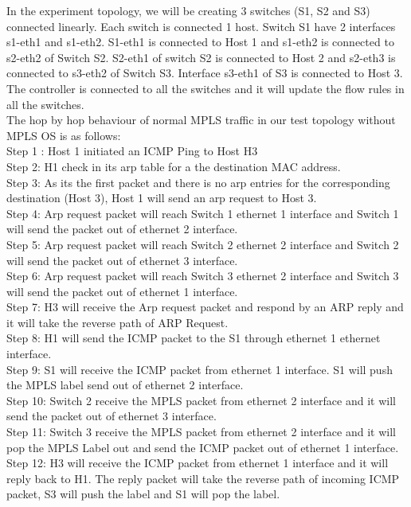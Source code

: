 In the experiment topology, we will be creating 3 switches (S1, S2 and S3) connected linearly. Each switch is connected 1 host. Switch S1 have 2 interfaces s1-eth1 and s1-eth2. S1-eth1 is connected to Host 1 and s1-eth2 is connected to s2-eth2 of Switch S2. S2-eth1 of switch S2 is connected to Host 2 and s2-eth3 is connected to s3-eth2 of Switch S3. Interface s3-eth1 of S3 is connected to Host 3.
The controller is connected to all the switches and it will update the flow rules in all the switches.\\

The hop by hop behaviour of normal MPLS traffic in our test topology without MPLS OS is as follows:\\

Step 1 : Host 1 initiated an ICMP Ping to Host H3\\
Step 2:  H1 check in its arp table for a the destination MAC address.\\
Step 3: As its the first packet and there is no arp entries for the corresponding destination (Host 3), Host 1 will send an arp request to Host 3.\\
Step 4: Arp request packet will reach Switch 1 ethernet 1 interface and Switch 1 will send the packet out of ethernet 2 interface.\\
Step 5: Arp request packet will reach Switch 2 ethernet 2 interface and Switch 2 will send the packet out of ethernet 3 interface.\\
Step 6: Arp request packet will reach Switch 3 ethernet 2 interface and Switch 3 will send the packet out of ethernet 1 interface.\\
Step 7: H3 will receive the Arp request packet and respond by an ARP reply and it will take the reverse path of ARP Request.\\
Step 8: H1 will send the ICMP packet to the S1 through ethernet 1 ethernet interface.\\
Step 9: S1 will receive the ICMP packet from ethernet 1 interface. S1 will push the MPLS label send out of ethernet 2 interface.\\
Step 10: Switch 2 receive the MPLS packet from ethernet 2 interface and it will send the packet out of ethernet 3 interface.\\
Step 11: Switch 3 receive the MPLS packet from ethernet 2 interface and it will pop the MPLS Label out and send the ICMP packet out of ethernet 1 interface.\\
Step 12:  H3 will receive the ICMP packet from ethernet 1 interface and it will reply back to H1. The reply packet will take the reverse path of incoming ICMP packet, S3 will push the label and S1 will pop the label.\\

